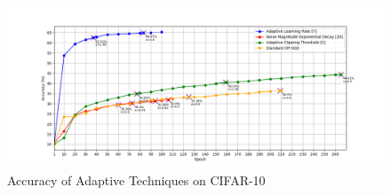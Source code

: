\begin{figure}[h]
\centering
        \includegraphics[width=\linewidth]{submissions/submission5/figs/AccAdaptCifar.png}
   \caption{Accuracy of Adaptive Techniques on CIFAR-10}
   \label{accadaptcifar}
\end{figure} 

